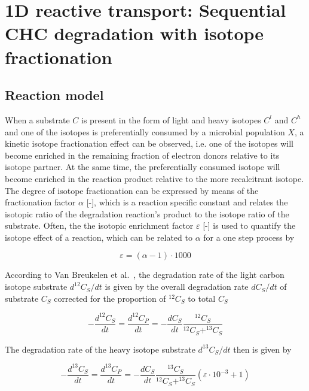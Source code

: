 \section[Sequential CHC degradation with isotope fractionation (1D)]{1D reactive transport: Sequential CHC degradation with isotope fractionation}
\label{l_s_benchmark_isofrac}

\subsection{Reaction model}
When a substrate $C$ is present in the form of light and heavy isotopes $C^l$ and $C^h$ and one of the isotopes is preferentially consumed by a microbial population $X$, a kinetic isotope fractionation effect can be observed, i.e. one of the isotopes will become enriched in the remaining fraction of electron donors relative to its isotope partner. At the same time, the preferentially consumed isotope will become enriched in the reaction product relative to the more recalcitrant isotope. The degree of isotope fractionation can be expressed by means of the fractionation factor $\alpha$ [-], which is a reaction specific constant and relates the isotopic ratio of the degradation reaction's product to the isotope ratio of the substrate. Often, the the isotopic enrichment factor $\varepsilon $ [-] is used to quantify the isotope effect of a reaction, which can be related to $\alpha$ for a one step process by

\begin{equation}
    \varepsilon =  (\alpha -1)\cdot1000
    \label{iso_enrichfac}
\end{equation}

According to Van Breukelen et al.~\cite{VanBr:05}, the degradation rate of the light carbon isotope substrate $d^{12}C_S/dt$ is given by the overall degradation rate $dC_S/dt$ of substrate $C_S$ corrected for the proportion of $^{12}C_S$ to total $C_S$

\begin{equation}
    -\frac{d^{12}C_S}{dt} = \frac{d^{12}C_P}{dt} = -\frac{dC_S}{dt} \frac{^{12}C_S}{^{12}C_S + ^{13}C_S}
    \label{iso_rate_gen1}
\end{equation}

The degradation rate of the heavy isotope substrate $d^{13}C_S/dt$ then is given by

\begin{equation}
    -\frac{d^{13}C_S}{dt} = \frac{d^{13}C_P}{dt} = -\frac{dC_S}{dt} \frac{^{13}C_S}{^{12}C_S + ^{13}C_S}(\varepsilon\cdot10^{-3}+1)
    \label{iso_rate_gen2}
\end{equation}

